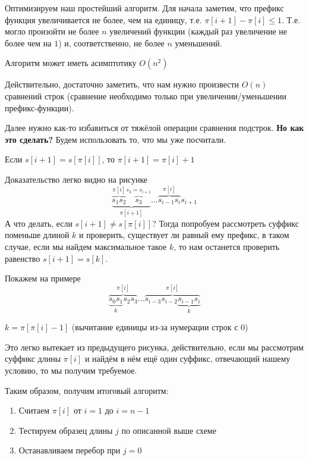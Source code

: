 Оптимизируем наш простейший алгоритм. Для начала заметим, что префикс функция увеличивается не более, чем
на единицу, т.е. $\pi [i + 1] - \pi [i] \leq 1$. Т.е. могло произойти не более $n$ увеличений функции (каждый
раз увеличение не более чем на $1$) и, соответственно, не более $n$ уменьшений.

\begin{remark}
	Алгоритм может иметь асимптотику $O(n^2)$
\end{remark}
Действительно, достаточно заметить, что нам нужно произвести $O(n)$ сравнений строк (сравнение необходимо только
при увеличении/уменьшении префикс-функции).

Далее нужно как-то избавиться от тяжёлой операции сравнения подстрок. \textbf{Но как это сделать?} Будем
использовать то, что мы уже посчитали.

\begin{remark}
	Если $s[i + 1] = s[\pi [i]]$, то $ \pi [i+1] = \pi [i] + 1$
\end{remark}
Доказательство легко видно на рисунке
\[
	\underbrace{\overbrace{s_1 s_2}^{\pi [i]} \overbrace{s_3}^{s_3 = s_{i+1}}}_{\pi[i+1]} \ldots \overbrace{s_{i-1} s_{i}}^{\pi[i]} s_{i+1} 
\] 
А что делать, если $s[i+1] \neq s[\pi[i]]$? Тогда попробуем рассмотреть суффикс поменьше длиной $k$ и проверить, 
существует ли равный ему префикс, в таком случае, если мы найдем максимальное такое $k$, то нам останется
проверить равенство $s[i+1] = s[k]$.

Покажем на примере
\[
	\overbrace{\underbrace{s_0 s_1}_{k} s_2 s_3}^{\pi [i]} \ldots \overbrace{s_{i-3} s_{i-2} \underbrace{s_{i-1} s_{i}}_{k}}^{\pi [i]}
\] 

\begin{remark}
	$k = \pi[\pi[i] - 1]$ (вычитание единицы из-за нумерации строк с 0)
\end{remark}

Это легко вытекает из предыдущего рисунка, действительно, если мы рассмотрим суффикс длины $\pi [i]$ и найдём 
в нём ещё один суффикс, отвечающий нашему условию, то мы получим требуемое.

Таким образом, получим итоговый алгоритм:

\begin{enumerate}
	\item Считаем $\pi [i]$ от $i = 1$ до $i = n - 1$
	\item Тестируем образец длины $j$ по описанной выше схеме
	\item Останавливаем перебор при $j = 0$
\end{enumerate}

